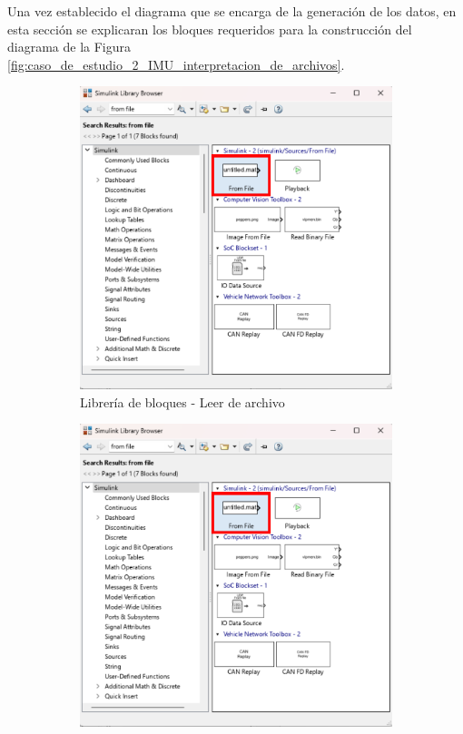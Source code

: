 Una vez establecido el diagrama que se encarga de la generación de los datos, en esta sección se explicaran los bloques requeridos para la construcción del diagrama de la Figura \ref{fig:caso_de_estudio_2_IMU_interpretacion_de_archivos}.

\begin{figure}[htbp]
    \centering
    \begin{subfigure}[b]{0.35\textwidth}
        \centering
        \includegraphics[width=\textwidth]{fig/Capitulo5/Caso_de_estudio_IMU/Generador_de_salidas/libreia_de_bloques_from_file.pdf}
        \caption{Librería de bloques - Leer de archivo}
        \label{fig:lib_bloques_from_file_IMU}
    \end{subfigure}
    \hfill
    \begin{subfigure}[b]{0.45\textwidth}
        \centering
        \includegraphics[width=\textwidth]{fig/Capitulo5/Caso_de_estudio_IMU/Generador_de_salidas/libreia_de_bloques_from_file.pdf}

\end{subfigure}
\end{figure}
